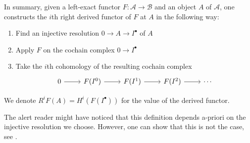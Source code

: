 In summary, given a left-exact functor $F:\mathcal{A}\to
\mathcal{B}$ and an object $A$ of $\mathcal{A}$, one constructs the $i$th
right derived functor of $F$ at $A$ in the following way:
\begin{enumerate}
  \item Find an injective resolution $0\to A\to I^{\bullet}$ of $A$
  \item Apply $F$ on the cochain complex $0\to I^{\bullet}$
  \item Take the $i$th cohomology of the resulting cochain complex
        \[\begin{tikzcd}
            0\rar & F(I^{0})\rar & F(I^{1})\rar
            & F(I^{2})\rar & \cdots
          \end{tikzcd}\]
\end{enumerate}
We denote $R^{i}F(A)=H^{i}(F(I^{\bullet}))$ for the value of the
derived functor.
\begin{lwarn}
  The alert reader might have noticed that this definition depends a-priori
  on the injective resolution we choose. However, one can show that this is
  not the case, see \cite{vakil}.
\end{lwarn}
